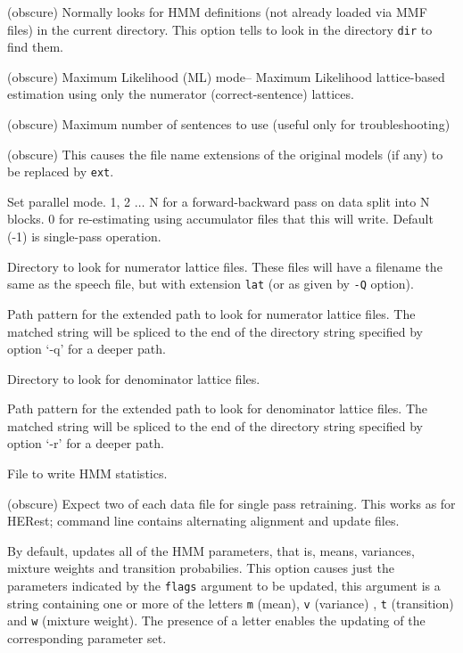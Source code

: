 \begin{optlist}

      (obscure)
      Normally  looks for HMM definitions
       (not already loaded via MMF files) 
      in the current directory.  This option tells  to look in
      the directory {\tt dir} to find them.

   (obscure) Maximum Likelihood (ML) mode-- Maximum Likelihood lattice-based
   estimation using only the numerator (correct-sentence) lattices.

   (obscure) Maximum number of sentences to use (useful only for troubleshooting)

   (obscure) This causes the file name extensions of the
      original models (if any) to be replaced by {\tt ext}.

    Set parallel mode.  1, 2 $\ldots$ N for a forward-backward
     pass on data split into N blocks.  0 for re-estimating using accumulator
    files that this will write.  Default (-1) is single-pass operation.

     Directory to look for numerator lattice files.  These files
      will have a filename the same as the speech file, but with extension
      \texttt{lat} (or as given by \texttt{-Q} option).

     Path pattern for the extended path to look for numerator lattice files. 
      The matched string will be spliced to the end of the directory string specified by
      option `-q' for a deeper path.

     Directory to look for denominator lattice files.

     Path pattern for the extended path to look for denominator lattice files.
     The matched string will be spliced to the end of the directory string specified by
      option `-r' for a deeper path.

    File to write HMM statistics.

   (obscure) Expect two of each data file for single pass retraining.  
    This works as for HERest; command line contains alternating alignment and update
    files.

   By default,  updates all of the HMM parameters,
      that is, means, variances, mixture weights and 
      transition probabilies. This 
      option causes just the parameters indicated by the {\tt flags}
      argument to be updated, this argument is a string containing one
      or more of the letters {\tt m} (mean), {\tt v} (variance) ,
      {\tt t} (transition) and {\tt w} (mixture weight).  The 
      presence of a letter enables
      the updating of the corresponding parameter set.


\end{optlist}
